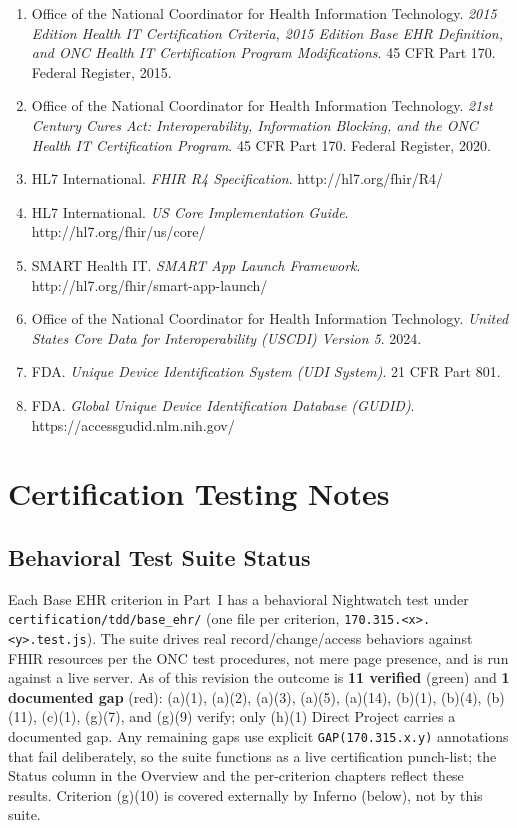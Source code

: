 \begin{enumerate}
\item Office of the National Coordinator for Health Information Technology. \textit{2015 Edition Health IT Certification Criteria, 2015 Edition Base EHR Definition, and ONC Health IT Certification Program Modifications}. 45 CFR Part 170. Federal Register, 2015.

\item Office of the National Coordinator for Health Information Technology. \textit{21st Century Cures Act: Interoperability, Information Blocking, and the ONC Health IT Certification Program}. 45 CFR Part 170. Federal Register, 2020.

\item HL7 International. \textit{FHIR R4 Specification}. http://hl7.org/fhir/R4/

\item HL7 International. \textit{US Core Implementation Guide}. http://hl7.org/fhir/us/core/

\item SMART Health IT. \textit{SMART App Launch Framework}. http://hl7.org/fhir/smart-app-launch/

\item Office of the National Coordinator for Health Information Technology. \textit{United States Core Data for Interoperability (USCDI) Version 5}. 2024.

\item FDA. \textit{Unique Device Identification System (UDI System)}. 21 CFR Part 801.

\item FDA. \textit{Global Unique Device Identification Database (GUDID)}. https://accessgudid.nlm.nih.gov/
\end{enumerate}

\chapter{Certification Testing Notes}

\section{Behavioral Test Suite Status}

Each Base EHR criterion in Part~I has a behavioral Nightwatch test under \texttt{certification/tdd/base\_ehr/} (one file per criterion, \texttt{170.315.<x>.<y>.test.js}). The suite drives real record/change/access behaviors against FHIR resources per the ONC test procedures, not mere page presence, and is run against a live server. As of this revision the outcome is \textbf{11 verified} (green) and \textbf{1 documented gap} (red): (a)(1), (a)(2), (a)(3), (a)(5), (a)(14), (b)(1), (b)(4), (b)(11), (c)(1), (g)(7), and (g)(9) verify; only (h)(1) Direct Project carries a documented gap. Any remaining gaps use explicit \texttt{GAP(170.315.x.y)} annotations that fail deliberately, so the suite functions as a live certification punch-list; the Status column in the Overview and the per-criterion chapters reflect these results. Criterion (g)(10) is covered externally by Inferno (below), not by this suite.

